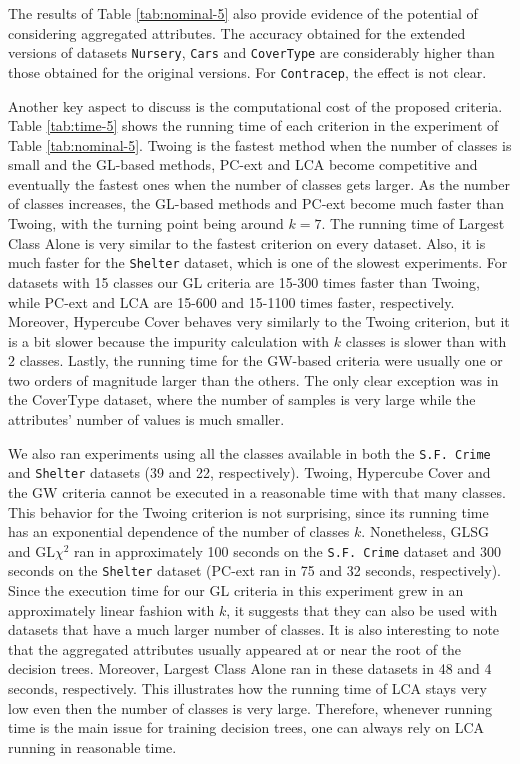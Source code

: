 The results of  Table \ref{tab:nominal-5} also provide evidence of  the potential of considering aggregated attributes. The accuracy obtained for the extended versions of datasets
{\tt Nursery}, {\tt Cars} and {\tt CoverType} are considerably higher than those obtained for the original versions. For {\tt Contracep}, the effect is not clear.

Another key aspect to discuss is the computational cost of the proposed criteria. Table \ref{tab:time-5} shows the running time of each criterion in the experiment of Table \ref{tab:nominal-5}. Twoing is the fastest method when the number of classes is small and the GL-based methods, PC-ext and LCA become competitive and eventually the fastest ones when the number of classes gets larger. As the number of classes increases, the GL-based methods and PC-ext become much faster than Twoing, with the turning point being around $k=7$. The  running time of Largest Class Alone is very similar to the fastest criterion on every dataset. Also, it is much faster for the {\tt Shelter} dataset, which is one of the slowest experiments. For datasets with 15 classes our GL criteria are 15-300 times faster than Twoing, while PC-ext and LCA are 15-600 and 15-1100 times faster, respectively. Moreover, Hypercube Cover behaves very similarly to the Twoing criterion, but it is a bit slower because the impurity calculation with $k$ classes is slower than with $2$ classes. Lastly, the running time for the GW-based criteria were usually one or two orders of magnitude larger than the others. The only clear exception was in the CoverType dataset, where the number of samples is very large while the attributes’ number of values is much smaller. 

We also ran experiments using all the classes available in both the {\tt S.F. Crime} and {\tt Shelter} datasets (39 and 22, respectively). Twoing, Hypercube Cover and the GW criteria cannot be executed in a reasonable time with that many classes. This behavior for the Twoing criterion is not surprising, since its running time has an exponential dependence of the number of classes $k$. Nonetheless, GLSG and GL$\chi^2$ ran in approximately 100 seconds on the {\tt S.F. Crime} dataset and  300 seconds on the {\tt Shelter} dataset (PC-ext ran in 75 and 32 seconds, respectively). Since the execution time for our GL criteria in this experiment grew in an approximately linear fashion with $k$, it suggests that they can also be used with datasets that have a much larger number of classes. It is also interesting to note that the aggregated attributes usually appeared at or near the root of the decision trees. Moreover, Largest Class Alone ran in these datasets in 48 and 4 seconds, respectively. This illustrates how the running time of LCA stays very low even then the number of classes is very large. Therefore, whenever running time is the main issue for training decision trees, one can always rely on LCA running in reasonable time. 

